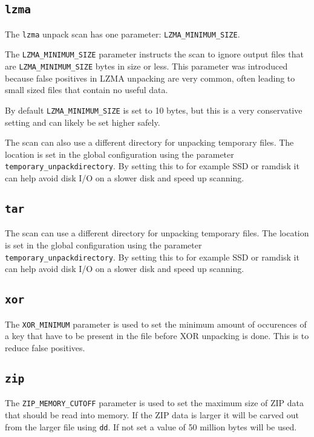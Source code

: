 \documentclass[10pt,a4paper]{article}
\begin{document}
\subsection{\texttt{lzma}}

The \texttt{lzma} unpack scan has one parameter: \texttt{LZMA\_MINIMUM\_SIZE}.

The \texttt{LZMA\_MINIMUM\_SIZE} parameter instructs the scan to ignore output
files that are \texttt{LZMA\_MINIMUM\_SIZE} bytes in size or less. This
parameter was introduced because false positives in LZMA unpacking are very
common, often leading to small sized files that contain no useful data.

By default \texttt{LZMA\_MINIMUM\_SIZE} is set to 10 bytes, but this is a very
conservative setting and can likely be set higher safely.

The scan can also use a different directory for unpacking temporary files.
The location is set in the global configuration using the parameter
\texttt{temporary\_unpackdirectory}. By setting this to for example SSD or
ramdisk it can help avoid disk I/O on a slower disk and speed up scanning.

\subsection{\texttt{tar}}

The scan can use a different directory for unpacking temporary files.
The location is set in the global configuration using the parameter
\texttt{temporary\_unpackdirectory}. By setting this to for example SSD or
ramdisk it can help avoid disk I/O on a slower disk and speed up scanning.

\subsection{\texttt{xor}}

The \texttt{XOR\_MINIMUM} parameter is used to set the minimum amount of
occurences of a key that have to be present in the file before XOR unpacking
is done. This is to reduce false positives.

\subsection{\texttt{zip}}

The \texttt{ZIP\_MEMORY\_CUTOFF} parameter is used to set the maximum size
of ZIP data that should be read into memory. If the ZIP data is larger it will
be carved out from the larger file using \texttt{dd}. If not set a value of 50
million bytes will be used.
\end{document}
